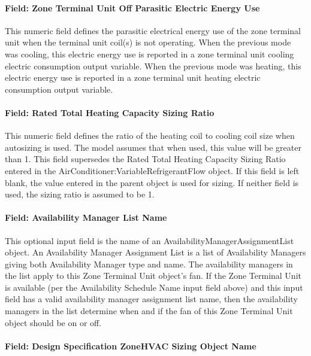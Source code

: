 \paragraph{Field: Zone Terminal Unit Off Parasitic Electric Energy Use}\label{field-zone-terminal-unit-off-parasitic-electric-energy-use-000}

This numeric field defines the parasitic electrical energy use of the zone terminal unit when the terminal unit coil(s) is not operating. When the previous mode was cooling, this electric energy use is reported in a zone terminal unit cooling electric consumption output variable. When the previous mode was heating, this electric energy use is reported in a zone terminal unit heating electric consumption output variable.

\paragraph{Field: Rated Total Heating Capacity Sizing Ratio}\label{field-rated-total-heating-capacity-sizing-ratio-000}

This numeric field defines the ratio of the heating coil to cooling coil size when autosizing is used. The model assumes that when used, this value will be greater than 1. This field supersedes the Rated Total Heating Capacity Sizing Ratio entered in the AirConditioner:VariableRefrigerantFlow object. If this field is left blank, the value entered in the parent object is used for sizing. If neither field is used, the sizing ratio is assumed to be 1.

\paragraph{Field: Availability Manager List Name}\label{field-availability-manager-list-name-10}

This optional input field is the name of an AvailabilityManagerAssignmentList object. An Availability Manager Assignment List is a list of Availability Managers giving both Availability Manager type and name. The availability managers in the list apply to this Zone Terminal Unit object's fan. If the Zone Terminal Unit is available (per the Availability Schedule Name input field above) and this input field has a valid availability manager assignment list name, then the availability managers in the list determine when and if the fan of this Zone Terminal Unit object should be on or off.

\paragraph{Field: Design Specification ZoneHVAC Sizing Object Name}\label{field-design-specification-zonehvac-sizing-object-name-9}

